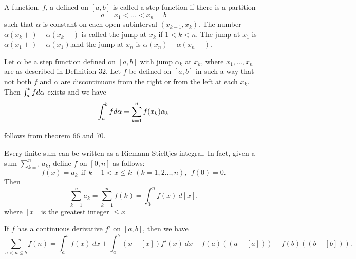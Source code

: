 \documentclass[10pt,a4paper]{book}
\begin{document}
\begin{deff}
A function, $f$, a defined on $[a, b]$ is called a step function
if there is a partition
$$a = x_1 < \dots < x_n = b$$
such that $\alpha$ is constant on each open subinterval $(x_{k-1}, x_k)$. The number $\alpha(x_k+) - \alpha(x_k-)$ is called the jump at $x_k$ if $1 < k < n$. The jump at $x_1$ is $\alpha(x_1+) - \alpha(x_1)$,and the jump at $x_n$ is $\alpha(x_n) - \alpha(x_n-)$.

\end{deff}

\begin{Thm}
Let $\alpha$ be a step function defined on $[a, b]$ with jump $\alpha_k$ at $x_k$, where $x_1, \dots,  x_n$ are as described
in Definition 32. Let $f$ be defined on $[a, b]$ in such a way that not both $f$ and $\alpha$ are discontinuous from the right or from the left at each $x_k$. Then $\int_a^b fd \alpha$ exists and we have
$$\int_a^b fd \alpha = \sum_{k=1}^n f(x_k)\alpha_k$$

\end{Thm}
\PP follows from theorem 66 and 70.
\begin{Thm}
Every finite sum can be written as a Riemann-Stieltjes integral. In fact, given a sum $\sum_{k=1}^n a_k$, define $f$ on $[0, n]$ as follows:
$$f(x) = a_k\ \ \text{if}\ \ k-1 < x \leq k\ \ (k = 1,2 \dots,n),\ \  f(0) = 0.$$
Then
$$\sum_{k=1}^n a_k = \sum_{k=1}^n f(k) = \int_0^n f(x)\  d[x].$$
where $[x]$ is the greatest integer $\leq x$
\end{Thm}

\begin{Thm}
If $f$ has a continuous derivative $f'$ on $[a, b]$, then we have
$$\sum_{a<n\leq b} f(n) =  \int_a^b f(x)\ dx + \int_a^b (x-[x])f'(x)\ dx + f(a)((a-[a])) - f(b)((b-[b])).$$
\end{Thm}
\end{document}
